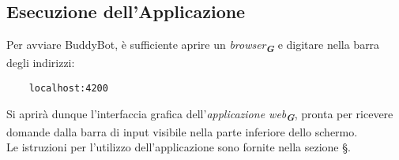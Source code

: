 \subsection{Esecuzione dell'Applicazione}
Per avviare BuddyBot, è sufficiente aprire un \emph{browser}\textsubscript{\textbf{\textit{G}}} e digitare nella barra
degli indirizzi:
\begin{verbatim}
    localhost:4200
\end{verbatim}
Si aprirà dunque l'interfaccia grafica dell'\emph{applicazione web}\textsubscript{\textbf{\textit{G}}}, pronta per ricevere domande
dalla barra di input visibile nella parte inferiore dello schermo.\\
Le istruzioni per l'utilizzo dell'applicazione sono fornite nella sezione \S{}.
